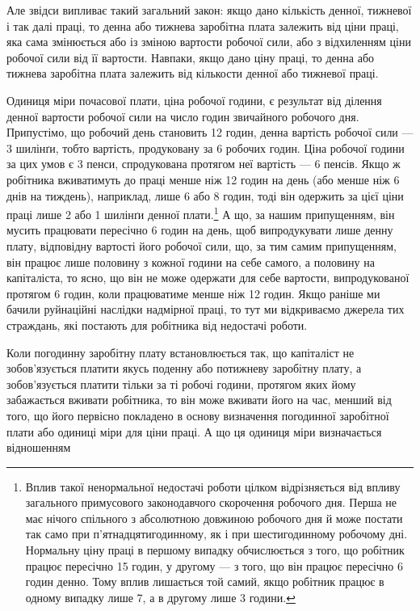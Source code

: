 Але звідси випливає такий загальний закон: якщо дано кількість
денної, тижневої і так далі праці, то денна або тижнева
заробітна плата залежить від ціни праці, яка сама змінюється
або із зміною вартости робочої сили, або з відхиленням ціни робочої
сили від її вартости. Навпаки, якщо дано ціну праці, то денна
або тижнева заробітна плата залежить від кількости денної або
тижневої праці.

Одиниця міри почасової плати, ціна робочої години, є результат
від ділення денної вартости робочої сили на число годин звичайного
робочого дня. Припустімо, що робочий день становить
12 годин, денна вартість робочої сили — 3 шилінґи, тобто вартість,
продуковану за 6 робочих годин. Ціна робочої години за
цих умов є 3 пенси, спродукована протягом неї вартість — 6 пенсів.
Якщо ж робітника вживатимуть до праці менше ніж 12 годин
на день (або менше ніж 6 днів на тиждень), наприклад, лише
6 або 8 годин, тоді він одержить за цієї ціни праці лише 2 або
1 шилінґи денної плати.\footnote{
Вплив такої ненормальної недостачі роботи цілком відрізняється
від впливу загального примусового законодавчого скорочення робочого
дня. Перша не має нічого спільного з абсолютною довжиною робочого
дня й може постати так само при п’ятнадцятигодинному, як і при шестигодинному
робочому дні. Нормальну ціну праці в першому випадку обчислюється
з того, що робітник працює пересічно 15 годин, у другому — з
того, що він працює пересічно 6 годин денно. Тому вплив лишається той
самий, якщо робітник працює в одному випадку лише 7, а в другому
лише 3 години.
} А що, за нашим припущенням, він
мусить працювати пересічно 6 годин на день, щоб випродукувати
лише денну плату, відповідну вартості його робочої сили, що,
за тим самим припущенням, він працює лише половину з кожної
години на себе самого, а половину на капіталіста, то ясно, що
він не може одержати для себе вартости, випродукованої протягом
6 годин, коли працюватиме менше ніж 12 годин. Якщо раніше
ми бачили руйнаційні наслідки надмірної праці, то тут ми відкриваємо
джерела тих страждань, які постають для робітника від
недостачі роботи.

Коли погодинну заробітну плату встановлюється так, що
капіталіст не зобов’язується платити якусь поденну або потижневу
заробітну плату, а зобов’язується платити тільки за ті
робочі години, протягом яких йому забажається вживати робітника,
то він може вживати його на час, менший від того, що його
первісно покладено в основу визначення погодинної заробітної
плати або одиниці міри для ціни праці. А що ця одиниця міри
визначається відношенням

